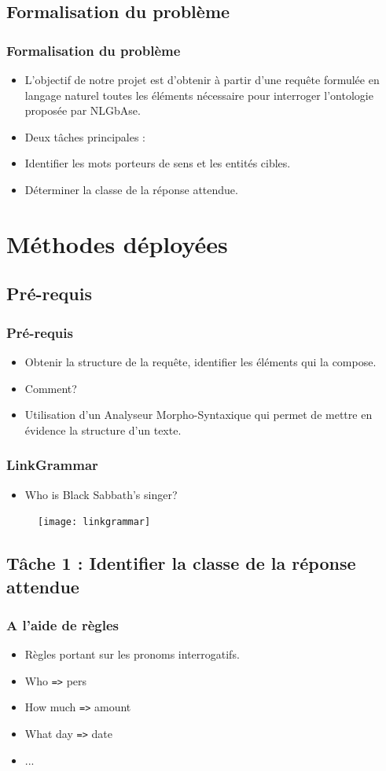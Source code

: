 \documentclass[xcolor=dvipsnames]{beamer}
\begin{document}
\subsection{Formalisation du problème}
\frame 
{
    \frametitle{Formalisation du problème}
    \begin{itemize}
        \item<1-> L'objectif de notre projet est d'obtenir à partir d'une requête formulée en langage naturel toutes les éléments nécessaire pour interroger l'ontologie proposée par NLGbAse.
        \item<2-> Deux tâches principales :
        \item<3-> Identifier les mots porteurs de sens et les entités cibles.
        \item<4-> Déterminer la classe de la réponse attendue.
    \end{itemize}
}

\section{Méthodes déployées}
\subsection{Pré-requis}
\frame
{
    \frametitle{Pré-requis}
    \begin{itemize}
        \item<1-> Obtenir la structure de la requête, identifier les éléments qui la compose.
        \item<2-> Comment?
        \item<3-> Utilisation d'un Analyseur Morpho-Syntaxique qui permet de mettre en évidence la structure d'un texte.
    \end{itemize}
}
\frame
{
    \frametitle{LinkGrammar}
    \begin{itemize}
        \item  Who is Black Sabbath's singer?
    \end{itemize}
    \begin{figure}
        \texttt{[image: linkgrammar]}
    \end{figure}
}

\subsection{Tâche 1 : Identifier la classe de la réponse attendue}
\frame
{
    \frametitle{A l'aide de règles}
    \begin{itemize}
        \item<1-> Règles portant sur les pronoms interrogatifs.
        \item<2-> Who \texttt{=>} pers
        \item<3-> How much \texttt{=>} amount
        \item<4-> What day \texttt{=>} date
        \item<5-> ...
    \end{itemize}
}
\end{document}
